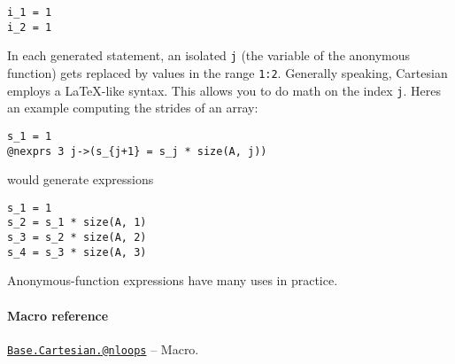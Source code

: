 \begin{verbatim}
i_1 = 1
i_2 = 1
\end{verbatim}



In each generated statement, an {\textquotedbl}isolated{\textquotedbl} \texttt{j} (the variable of the anonymous function) gets replaced by values in the range \texttt{1:2}. Generally speaking, Cartesian employs a LaTeX-like syntax.  This allows you to do math on the index \texttt{j}.  Here{\textquotesingle}s an example computing the strides of an array:




\begin{verbatim}
s_1 = 1
@nexprs 3 j->(s_{j+1} = s_j * size(A, j))
\end{verbatim}



would generate expressions




\begin{verbatim}
s_1 = 1
s_2 = s_1 * size(A, 1)
s_3 = s_2 * size(A, 2)
s_4 = s_3 * size(A, 3)
\end{verbatim}



Anonymous-function expressions have many uses in practice.



\hypertarget{908996570436533510}{}


\paragraph{Macro reference}


\hypertarget{4938945836201444124}{} 
\hyperlink{4938945836201444124}{\texttt{Base.Cartesian.@nloops}}  -- {Macro.}

